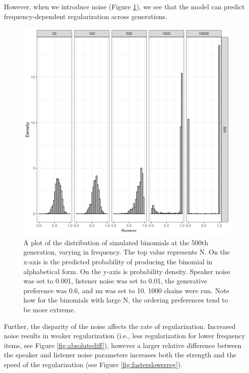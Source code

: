 \documentclass[10pt, letterpaper]{article}
\newenvironment{CodeChunk}{}{}
\begin{document}
However, when we introduce noise (Figure \ref{fig:regularizationplot1}),
we see that the model can predict frequency-dependent regularization
across generations.

\begin{CodeChunk}
\begin{figure}[tb]

{\centering \includegraphics[width=1\linewidth]{Figures/speaker_noise_001_listener_01} 

}

\caption[A plot of the distribution of simulated binomials at the 500th generation, varying in frequency]{A plot of the distribution of simulated binomials at the 500th generation, varying in frequency. The top value represents N. On the x-axis is the predicted probability of producing the binomial in alphabetical form. On the y-axis is probability density. Speaker noise was set to 0.001, listener noise was set to 0.01, the generative preference was 0.6, and nu was set to 10. 1000 chains were run. Note how for the binomials with large N, the ordering preferences tend to be more extreme.}\label{fig:regularizationplot1}
\end{figure}
\end{CodeChunk}

Further, the disparity of the noise affects the rate of regularization.
Increased noise results in weaker regularization (i.e., less
regularization for lower frequency items, see Figure
\ref{fig:absolutediff}), however a larger relative difference between
the speaker and listener noise parameters increases both the strength
and the speed of the regularization (see Figure
\ref{fig:fasterslowerreg}).
\end{document}

